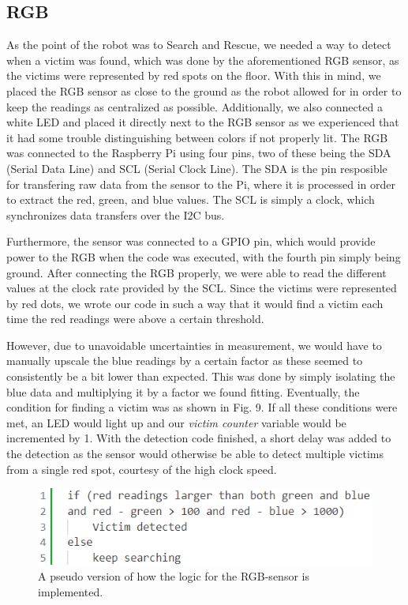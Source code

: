 \documentclass[conference]{IEEEtran}
\begin{document}
\subsection{RGB}
As the point of the robot was to Search and Rescue, we needed a way to detect when a victim was found, which was done by the aforementioned RGB sensor, as the victims were represented by red spots on the floor.
With this in mind, we placed the RGB sensor as close to the ground as the robot allowed for in order to keep the readings as centralized as possible.
Additionally, we also connected a white LED and placed it directly next to the RGB sensor as we experienced that it had some trouble distinguishing between colors if not properly lit.
The RGB was connected to the Raspberry Pi using four pins, two of these being the SDA (Serial Data Line) and SCL (Serial Clock Line)\cite{b4}. The SDA is the pin resposible for transfering raw data from the sensor to the Pi, where it is processed in order to extract the red, green, and blue values.
The SCL is simply a clock, which synchronizes data transfers over the I2C bus.

Furthermore, the sensor was connected to a GPIO pin, which would provide power to the RGB when the code was executed, with the fourth pin simply being ground.
After connecting the RGB properly, we were able to read the different values at the clock rate provided by the SCL.
Since the victims were represented by red dots, we wrote our code in such a way that it would find a victim each time the red readings were above a certain threshold.

However, due to unavoidable uncertainties in measurement, we would have to manually upscale the blue readings by a certain factor as these seemed to consistently be a bit lower than expected.
This was done by simply isolating the blue data and multiplying it by a factor we found fitting.
Eventually, the condition for finding a victim was as shown in Fig. 9.
If all these conditions were met, an LED would light up and our \textit{victim counter} variable would be incremented by 1.
With the detection code finished, a short delay was added to the detection as the sensor would otherwise be able to detect multiple victims from a single red spot, courtesy of the high clock speed.

\begin{figure}[htbp]
    \centerline{\includegraphics[width=1.0\columnwidth]{Pictures/rgbpseudo.png}}
    \caption{A pseudo version of how the logic for the RGB-sensor is implemented.}
    \label{sec:rgb}
    \end{figure}
\end{document}
